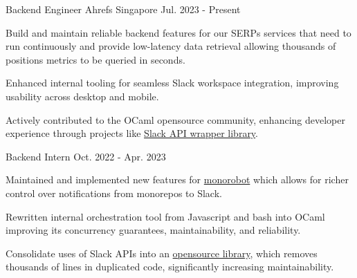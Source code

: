 

\begin{cventries}
  \cventrytwo
    {Backend Engineer} %
    {Ahrefs} %
    {Singapore} %
    {Jul. 2023 - Present} %
    {
      \begin{cvitems} %
        \item {Build and maintain reliable backend features for our SERPs services that need to run continuously and provide low-latency data retrieval allowing thousands of positions metrics to be queried in seconds.} %
        \item {Enhanced internal tooling for seamless Slack workspace integration, improving usability across desktop and mobile.}
        \item {Actively contributed to the OCaml opensource community, enhancing developer experience through projects like \href{https://github.com/ahrefs/slack}{Slack API wrapper library}.}
      \end{cvitems}
    }
    {Backend Intern} %
    {Oct. 2022 - Apr. 2023} %
    {
      \begin{cvitems} %
        \item {Maintained and implemented new features for \href{https://github.com/ahrefs/monorobot}{monorobot} which allows for richer control over notifications from monorepos to Slack.}
        \item {Rewritten internal orchestration tool from Javascript and bash into OCaml improving its concurrency guarantees, maintainability, and reliability.}
        \item {Consolidate uses of Slack APIs into an \href{https://github.com/ahrefs/slack}{opensource library}, which removes thousands of lines in duplicated code, significantly increasing maintainability.}
      \end{cvitems}
    }


\end{cventries}
